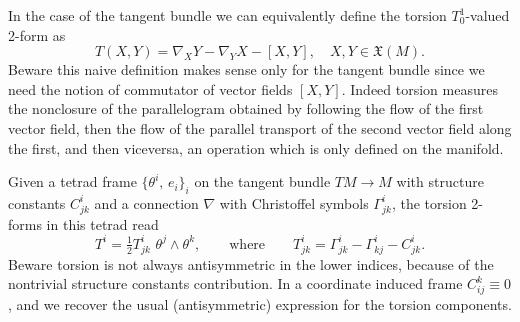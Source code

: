 \documentclass[../geometry_main.tex]{subfiles}
\begin{document}
\begin{mytheorem}
%
In the case of the tangent bundle we can equivalently define the torsion $T_0^1$-valued 2-form as 
\begin{equation}
    T(X,Y) = \nabla_X Y - \nabla_Y X - [X,Y],\quad X,Y \in \mathfrak{X}(M).
\end{equation}
Beware this naive definition makes sense only for the tangent bundle since we need the notion of commutator of vector fields $[X,Y]$.
Indeed torsion measures the nonclosure of the parallelogram obtained by following the flow of the first vector field, then the flow of the parallel transport of the second vector field along the first, and then viceversa, an operation which is only defined on the manifold.

Given a tetrad frame \(\{\theta^i,\, e_i\}_i\) on the tangent bundle \(TM\to M\) with structure constants \(C^i_{jk}\) and a connection \(\nabla\) with Christoffel symbols \(\Gamma^i_{jk}\), the torsion 2-forms in this tetrad read
\begin{equation}
    T^i = \tfrac{1}{2} T^i_{jk} \,\, \theta^j \wedge \theta^k,
    \qquad \text{where}\qquad
    T^i_{jk} = \Gamma^i_{jk} - \Gamma^i_{kj} - C^i_{jk}.
\end{equation}
Beware torsion is not always antisymmetric in the lower indices, because of the nontrivial structure constants contribution.
In a coordinate induced frame $C_{ij}^k\equiv0$, and we recover the usual (antisymmetric) expression for the torsion components.
%
\end{mytheorem}
\end{document}
